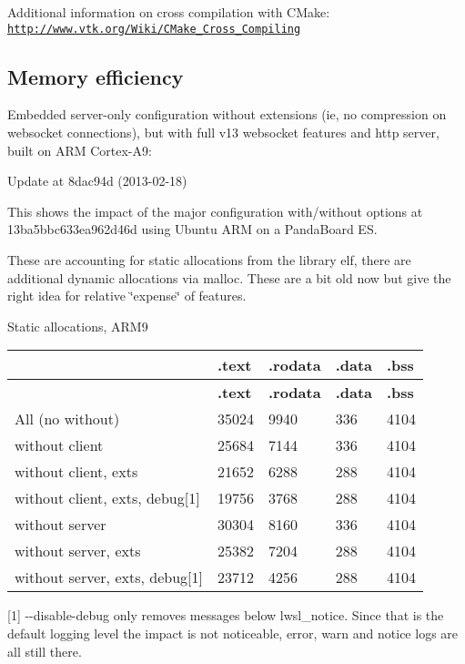 Additional information on cross compilation with C\+Make\+: \href{http://www.vtk.org/Wiki/CMake_Cross_Compiling}{\tt http\+://www.\+vtk.\+org/\+Wiki/\+C\+Make\+\_\+\+Cross\+\_\+\+Compiling}

\subsection*{Memory efficiency }

Embedded server-\/only configuration without extensions (ie, no compression on websocket connections), but with full v13 websocket features and http server, built on A\+RM Cortex-\/\+A9\+:

Update at 8dac94d (2013-\/02-\/18) 
 This shows the impact of the major configuration with/without options at 13ba5bbc633ea962d46d using Ubuntu A\+RM on a Panda\+Board ES.

These are accounting for static allocations from the library elf, there are additional dynamic allocations via malloc. These are a bit old now but give the right idea for relative \char`\"{}expense\char`\"{} of features.

Static allocations, A\+R\+M9

\tabulinesep=1mm
\begin{longtabu} spread 0pt [c]{*5{|X[-1]}|}
\hline
\rowcolor{\tableheadbgcolor}{\bf }&{\bf .text }&{\bf .rodata }&{\bf .data }&{\bf .bss  }\\
\endfirsthead
\hline
\endfoot
\hline
\rowcolor{\tableheadbgcolor}{\bf }&{\bf .text }&{\bf .rodata }&{\bf .data }&{\bf .bss  }\\
\endhead
All (no without) &35024 &9940 &336 &4104 \\
without client &25684 &7144 &336 &4104 \\
without client, exts &21652 &6288 &288 &4104 \\
without client, exts, debug\mbox{[}1\mbox{]} &19756 &3768 &288 &4104 \\
without server &30304 &8160 &336 &4104 \\
without server, exts &25382 &7204 &288 &4104 \\
without server, exts, debug\mbox{[}1\mbox{]} &23712 &4256 &288 &4104 \\
\end{longtabu}
\mbox{[}1\mbox{]} {\ttfamily -\/-\/disable-\/debug} only removes messages below {\ttfamily lwsl\+\_\+notice}. Since that is the default logging level the impact is not noticeable, error, warn and notice logs are all still there.

